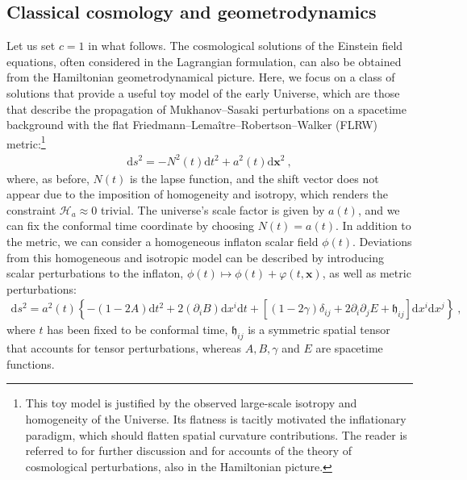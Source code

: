 \documentclass[12pt]{iopart}
\def\eq#1{\begin{equation}\begin{aligned}#1\end{aligned}\end{equation}}
\def\D{\mathrm{d}}
\def\x{\mathbf{x}}
\begin{document}
\subsection{\label{sec:classical-cosmo}Classical cosmology and geometrodynamics}
Let us set $c=1$ in what follows. The cosmological solutions of the Einstein field equations, often considered in the Lagrangian formulation, can also be obtained from the Hamiltonian geometrodynamical picture. Here, we focus on a class of solutions that provide a useful toy model of the early Universe, which are those that describe the propagation of Mukhanov--Sasaki perturbations on a spacetime background with the flat Friedmann--Lema\^{i}tre--Robertson--Walker (FLRW) metric:\footnote{This toy model is justified by the observed large-scale isotropy and homogeneity of the Universe. Its flatness is tacitly motivated the inflationary paradigm, which should flatten spatial curvature contributions. The reader is referred to \citet{HalliwellHawking,Mukhanov:1990me,Langlois:1994ec,Malkiewicz:2018ohk} for further discussion and for accounts of the theory of cosmological perturbations, also in the Hamiltonian picture.} 
\eq{\label{eq:FLRW-metric}
\D s^2 = -N^2(t)\D t^2+a^2(t)\D\x^2 \ , 
}
where, as before, $N(t)$ is the lapse function, and the shift vector does not appear due to the imposition of homogeneity and isotropy, which renders the constraint $\mathcal{H}_a\approx0$ trivial. The universe's scale factor is given by $a(t)$, and we can fix the conformal time coordinate by choosing $N(t) = a(t)$. In addition to the metric, we can consider a homogeneous inflaton scalar field $\phi(t)$. Deviations from this homogeneous and isotropic model can be described by introducing scalar perturbations to the inflaton, $\phi(t)\mapsto\phi(t)+\varphi(t,\x)$, as well as metric perturbations:
\eq{
\D s^2 = a^2(t)\left\{-(1-2A)\D t^2+2(\partial_iB)\D x^i\D t+[(1-2\gamma)\delta_{ij}+2\partial_i\partial_j E+\mathfrak{h}_{ij}]\D x^i\D x^j\right\} \ ,
}
where $t$ has been fixed to be conformal time, $\mathfrak{h}_{ij}$ is a symmetric spatial tensor that accounts for tensor perturbations, whereas $A, B, \gamma$ and $E$ are spacetime functions.
\end{document}

